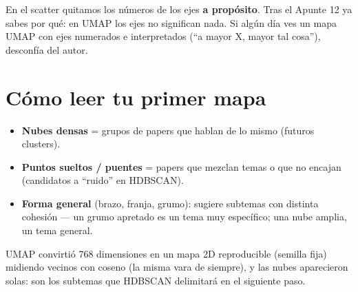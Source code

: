 \documentclass[11pt,a4paper]{article}
\begin{document}
\begin{ojo}
En el scatter quitamos los números de los ejes \textbf{a propósito}. Tras el Apunte 12 ya
sabes por qué: en UMAP los ejes no significan nada. Si algún día ves un mapa UMAP con ejes
numerados e interpretados (``a mayor X, mayor tal cosa''), desconfía del autor.
\end{ojo}

\section{Cómo leer tu primer mapa}

\begin{itemize}
  \item \textbf{Nubes densas} = grupos de papers que hablan de lo mismo (futuros clusters).
  \item \textbf{Puntos sueltos / puentes} = papers que mezclan temas o que no encajan
        (candidatos a ``ruido'' en HDBSCAN).
  \item \textbf{Forma general} (brazo, franja, grumo): sugiere subtemas con distinta cohesión
        --- un grumo apretado es un tema muy específico; una nube amplia, un tema general.
\end{itemize}

\begin{resumen}
UMAP convirtió 768 dimensiones en un mapa 2D reproducible (semilla fija) midiendo vecinos
con coseno (la misma vara de siempre), y las nubes aparecieron solas: son los subtemas que
HDBSCAN delimitará en el siguiente paso.
\end{resumen}
\end{document}
